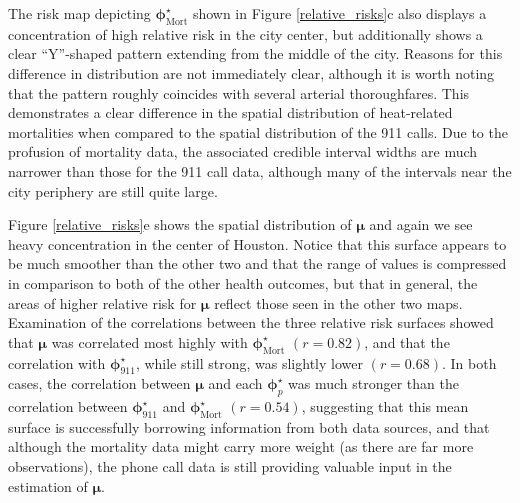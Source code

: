 \documentclass[final]{statsoc}
\begin{document}
The risk map depicting $\boldsymbol\phi^\star_{\text{Mort}}$ shown in Figure \ref{relative_risks}c also displays a concentration of high relative risk in the city center, but additionally shows a clear ``Y''-shaped pattern extending from the middle of the city. Reasons for this difference in distribution are not immediately clear, although it is worth noting that the pattern roughly coincides with several arterial thoroughfares. This demonstrates a clear difference in the spatial distribution of heat-related mortalities when compared to the spatial distribution of the 911 calls. Due to the profusion of mortality data, the associated credible interval widths are much narrower than those for the 911 call data, although many of the intervals near the city periphery are still quite large.

Figure \ref{relative_risks}e shows the spatial distribution of $\boldsymbol\mu$ and again we see heavy concentration in the center of Houston. Notice that this surface appears to be much smoother than the other two and that the range of values is compressed in comparison to both of the other health outcomes, but that in general, the areas of higher relative risk for $\boldsymbol\mu$ reflect those seen in the other two maps. Examination of the correlations between the three relative risk surfaces showed that $\boldsymbol\mu$ was correlated most highly with $\boldsymbol\phi^\star_{\text{Mort}}$ $(r=0.82)$, and that the correlation with $\boldsymbol\phi^\star_{911}$, while still strong, was slightly lower $(r=0.68)$. In both cases, the correlation between $\boldsymbol\mu$ and each $\boldsymbol\phi^\star_p$ was much stronger than the correlation between $\boldsymbol\phi^\star_{911}$ and $\boldsymbol\phi^\star_{\text{Mort}}$ $(r=0.54)$, suggesting that this mean surface is successfully borrowing information from both data sources, and that although the mortality data might carry more weight (as there are far more observations), the phone call data is still providing valuable input in the estimation of $\boldsymbol\mu$. 
\end{document}
